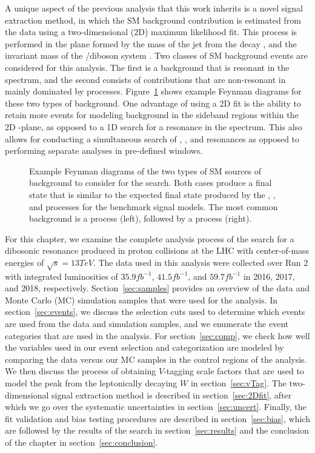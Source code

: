 A unique aspect of the previous analysis that this work inherits is a novel signal extraction method, in which the SM background contribution is estimated from the data using a two-dimensional (2D) maximum likelihood fit.
This process is performed in the plane formed by the mass of the jet from the \VorH decay \MJ, and the invariant mass of the \WV/\WH diboson system \MVV.
Two classes of SM background events are considered for this analysis.
The first is a \WVt background that is resonant in the \MJ spectrum, and the second consists of contributions that are non-resonant in \MJ mainly dominated by \Wjets processes.
Figure~\ref{fig:bkgFeynman} shows example Feynman diagrams for these two types of background.
One advantage of using a 2D fit is the ability to retain more events for modeling background in the sideband regions within the 2D \MJ-\MVV plane, as opposed to a 1D search for a resonance in the \MVV spectrum.
This also allows for conducting a simultaneous search of \WW, \WZ, and \WH resonances as opposed to performing separate analyses in pre-defined \MJ windows.

\begin{figure}[htbp]
  \centering
  
  \caption{
    Example Feynman diagrams of the two types of SM sources of background to consider for the search.
    Both cases produce a final state that is similar to the expected final state produced by the \ggF, \DY, and \VBF processes for the benchmark signal models.
    The most common background is a \Wjets process (left), followed by a \WVt process (right).
  }
  \label{fig:bkgFeynman}
\end{figure}

For this chapter, we examine the complete analysis process of the search for a dibosonic resonance produced in proton collisions at the LHC with center-of-mass energies of $\sqrt{s}=13\unit{TeV}$.
The data used in this analysis were collected over Run 2 with integrated luminosities of $35.9\unit{fb^{-1}}$, $41.5\unit{fb^{-1}}$, and $59.7\unit{fb^{-1}}$ in 2016, 2017, and 2018, respectively.
Section~\ref{sec:samples} provides an overview of the data and Monte Carlo (MC) simulation samples that were used for the analysis.
In section~\ref{sec:events}, we discuss the selection cuts used to determine which events are used from the data and simulation samples, and we enumerate the event categories that are used in the analysis.
For section~\ref{sec:comp}, we check how well the variables used in our event selection and categorization are modeled by comparing the data versus our MC samples in the control regions of the analysis.
We then discuss the process of obtaining $V$-tagging scale factors that are used to model the peak from the leptonically decaying $W$ in section~\ref{sec:vTag}.
The two-dimensional signal extraction method is described in section~\ref{sec:2Dfit}, after which we go over the systematic uncertainties in section~\ref{sec:uncert}.
Finally, the fit validation and bias testing procedures are described in section~\ref{sec:bias}, which are followed by the results of the search in section~\ref{sec:results} and the conclusion of the chapter in section~\ref{sec:conclusion}.
